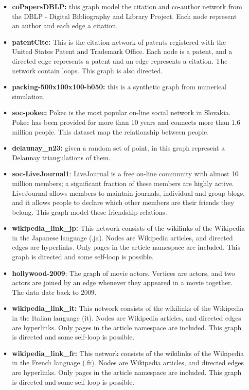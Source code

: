 \begin{itemize}
	\item \textbf{coPapersDBLP:} this graph model the citation and co-author network from the DBLP - Digital Bibliography and Library Project. Each node represent an author and each edge a citation.
	\item \textbf{patentCite:} This is the citation network of patents registered with the United States Patent and Trademark Office. Each node is a patent, and a directed edge represents a patent and an edge represents a citation. The network contain loops. This graph is also directed.
	\item \textbf{packing-500x100x100-b050:} this is a synthetic graph from numerical simulation.  
	\item \textbf{soc-pokec:} Pokec is the most popular on-line social network in Slovakia. Pokec has been provided for more than 10 years and connects more than 1.6 million people. This dataset map the relationship between people.
	\item \textbf{delaunay\_n23:} given a random set of point, in this graph represent a Delaunay triangulations of them.
	\item \textbf{soc-LiveJournal1}: LiveJournal is a free on-line community with almost 10 million members; a significant fraction of these members are highly active. LiveJournal allows members to maintain journals, individual and group blogs, and it allows people to declare which other members are their friends they belong. This graph model these friendship relations. 
	\item \textbf{wikipedia\_link\_jp:} This network consists of the wikilinks of the Wikipedia in the Japanese language (.ja). Nodes are Wikipedia articles, and directed edges are hyperlinks. Only pages in the article namespace are included. This graph is directed and some self-loop is possible.
	\item \textbf{hollywood-2009}: The graph of           
	movie actors. Vertices are actors, and two actors are joined             
	by an edge whenever they appeared in a movie together. The data date back to 2009. 
	\item \textbf{wikipedia\_link\_it:} This network consists of the wikilinks of the Wikipedia in the Italian language (it). Nodes are Wikipedia articles, and directed edges are hyperlinks. Only pages in the article namespace are included. This graph is directed and some self-loop is possible.
	\item \textbf{wikipedia\_link\_fr:} This network consists of the wikilinks of the Wikipedia in the French language (.fr). Nodes are Wikipedia articles, and directed edges are hyperlinks. Only pages in the article namespace are included. This graph is directed and some self-loop is possible.

\end{itemize}
